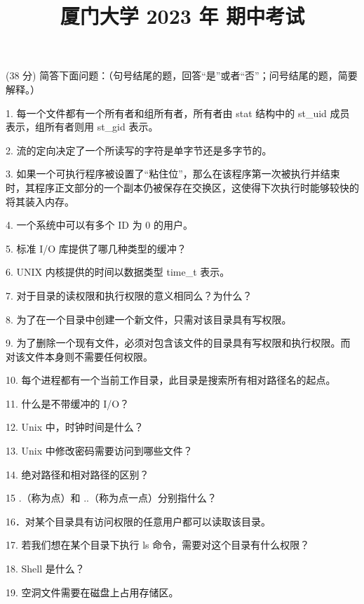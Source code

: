 \documentclass[fontset=exam]{exam-zh}
\title{厦门大学 2023 年 期中考试}
\begin{document}
\maketitle
{}
(38 分) 简答下面问题：（句号结尾的题，回答``是''或者``否''；问号结尾的题，简要解释。）

1. 每一个文件都有一个所有者和组所有者，所有者由 stat 结构中的 st\_uid 成员表示，组所有者则用 st\_gid 表示。

2. 流的定向决定了一个所读写的字符是单字节还是多字节的。

3. 如果一个可执行程序被设置了``粘住位''，那么在该程序第一次被执行并结束时，其程序正文部分的一个副本仍被保存在交换区，这使得下次执行时能够较快的将其装入内存。

4. 一个系统中可以有多个 ID 为 0 的用户。

5. 标准 I/O 库提供了哪几种类型的缓冲？

6. UNIX 内核提供的时间以数据类型 time\_t 表示。

7. 对于目录的读权限和执行权限的意义相同么？为什么？

8. 为了在一个目录中创建一个新文件，只需对该目录具有写权限。

9. 为了删除一个现有文件，必须对包含该文件的目录具有写权限和执行权限。而对该文件本身则不需要任何权限。

10. 每个进程都有一个当前工作目录，此目录是搜索所有相对路径名的起点。

11. 什么是不带缓冲的 I/O？

12. Unix 中，时钟时间是什么？

13. Unix 中修改密码需要访问到哪些文件？

14. 绝对路径和相对路径的区别？

15 .（称为点）和 ..（称为点一点）分别指什么？

16．对某个目录具有访问权限的任意用户都可以读取该目录。

17. 若我们想在某个目录下执行 ls 命令，需要对这个目录有什么权限？

18. Shell 是什么？

19. 空洞文件需要在磁盘上占用存储区。
\end{document}
